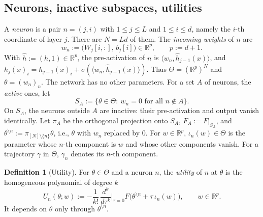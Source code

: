 \documentclass[11pt]{article}
\theoremstyle{definition}
\newtheorem{definition}[theorem]{Definition}
\theoremstyle{remark}
\numberwithin{equation}{section}
\newcommand{\R}{\mathbb{R}}
\newcommand{\sm}{\setminus}
\newcommand{\ip}[2]{\langle #1,#2\rangle}
\begin{document}
\subsection{Neurons, inactive subspaces, utilities}

A \emph{neuron} is a pair $n=(j,i)$ with $1\le j\le L$ and $1\le i\le d$, namely the $i$-th coordinate of layer $j$. There are $N=Ld$ of them. The \emph{incoming weights} of $n$ are
\[
w_n:=\big(W_j[i,:],\,b_j[i]\big)\in\R^p,\qquad p:=d+1 .
\]
With $\hat h:=(h,1)\in\R^p$, the pre-activation of $n$ is $\ip{w_n}{\hat h_{j-1}(x)}$, and $h_j(x)_i=h_{j-1}(x)_i+\sigma(\ip{w_n}{\hat h_{j-1}(x)})$. Thus $\Theta=(\R^p)^N$ and $\theta=(w_n)_n$. The network has no other parameters. For a set $A$ of neurons, the \emph{active} ones, let
\[
S_A:=\{\theta\in\Theta:\ w_n=0\text{ for all }n\notin A\}.
\]
On $S_A$, the neurons outside $A$ are inactive: their pre-activation and output vanish identically. Let $\pi_A$ be the orthogonal projection onto $S_A$, $F_A:=F|_{S_A}$, and $\theta^{\sm n}:=\pi_{[N]\sm\{n\}}\theta$, i.e., $\theta$ with $w_n$ replaced by $0$. For $w\in\R^p$, $\iota_n(w)\in\Theta$ is the parameter whose $n$-th component is $w$ and whose other components vanish. For a trajectory $\gamma$ in $\Theta$, $\gamma_n$ denotes its $n$-th component.

\begin{definition}[Utility]
For $\theta\in\Theta$ and a neuron $n$, the \emph{utility} of $n$ at $\theta$ is the homogeneous polynomial of degree $k$
\[
U_n(\theta;w):=-\frac1{k!}\,\frac{d^k}{d\tau^k}\Big|_{\tau=0}F\big(\theta^{\sm n}+\tau\,\iota_n(w)\big),\qquad w\in\R^p .
\]
It depends on $\theta$ only through $\theta^{\sm n}$.
\end{definition}
\end{document}
